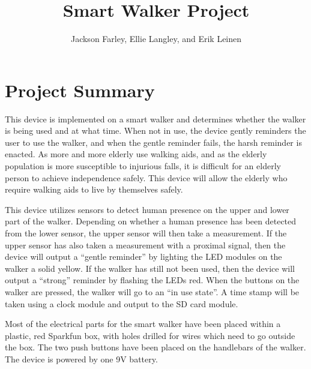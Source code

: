 \documentclass{article}
\author{Jackson Farley, Ellie Langley, and Erik Leinen}
\title{Smart Walker Project}
\begin{document}
\maketitle
\tableofcontents
\listoffigures


\section{Project Summary}
This device is implemented on a smart walker and determines whether the walker is being used and at what time. When not in use, the device gently reminders the user to use the walker, and when the gentle reminder fails, the harsh reminder is enacted. As more and more elderly use walking aids, and as the elderly population is more susceptible to injurious falls, it is difficult for an elderly person to achieve independence safely. This device will allow the elderly who require walking aids to live by themselves safely.

This device utilizes sensors to detect human presence on the upper and lower part of the walker. Depending on whether a human presence has been detected from the lower sensor, the upper sensor will then take a measurement. If the upper sensor has also taken a measurement with a proximal signal, then the device will output a “gentle reminder” by lighting the LED modules on the walker a solid yellow. If the walker has still not been used, then the device will output a “strong” reminder by flashing the LEDs red. When the buttons on the walker are pressed, the walker will go to an “in use state”. A time stamp will be taken using a clock module and output to the SD card module. 

Most of the electrical parts for the smart walker have been placed within a plastic, red Sparkfun box, with holes drilled for wires which need to go outside the box. The two push buttons have been placed on the handlebars of the walker. The device is powered by one 9V battery.
\end{document}
